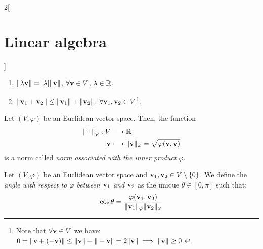 \documentclass[../../../main.tex]{subfiles}
\begin{document}
\begin{multicols}{2}[\section{Linear algebra}]
\begin{definition}
\begin{enumerate}
            \item $\|\lambda \boldsymbol{\mathrm{v}}\|=|\lambda|\|\boldsymbol{\mathrm{v}}\|$, $\forall \boldsymbol{\mathrm{v}}\in V$, $\lambda\in\mathbb{R}$.
            \item $\|\boldsymbol{\mathrm{v}}_1+\boldsymbol{\mathrm{v}}_2\|\leq\|\boldsymbol{\mathrm{v}}_1\|+\|\boldsymbol{\mathrm{v}}_2\|$, $\forall \boldsymbol{\mathrm{v}}_1,\boldsymbol{\mathrm{v}}_2\in V$\footnote{Note that $\forall\boldsymbol{\mathrm{v}}\in V$ we have: $0=\|\boldsymbol{\mathrm{v}}+(-\boldsymbol{\mathrm{v}})\|\leq\|\boldsymbol{\mathrm{v}}\|+\|-\boldsymbol{\mathrm{v}}\|=2\|\boldsymbol{\mathrm{v}}\|\implies\|\boldsymbol{\mathrm{v}}\|\geq 0$.}.
        \end{enumerate}
    \end{definition}
    \begin{prop}
        Let $(V,\varphi)$ be an Euclidean vector space. Then, the function
        \begin{align*}
            \|\cdot\|_\varphi:V & \longrightarrow\mathbb{R}                                                                              \\
            \boldsymbol{\mathrm{v}}  & \longmapsto\|\boldsymbol{\mathrm{v}}\|_\varphi=\sqrt{\varphi(\boldsymbol{\mathrm{v}},\boldsymbol{\mathrm{v}})}
        \end{align*}
        is a norm called \textit{norm associated with the inner product $\varphi$}.
    \end{prop}
    \begin{definition}
        Let $(V,\varphi)$ be an Euclidean vector space and $\boldsymbol{\mathrm{v}}_1,\boldsymbol{\mathrm{v}}_2\in V\setminus\{0\}$. We define the \textit{angle with respect to $\varphi$ between $\boldsymbol{\mathrm{v}}_1$ and $\boldsymbol{\mathrm{v}}_2$} as the unique $\theta\in[0,\pi]$ such that: $$\cos{\theta}=\frac{\varphi(\boldsymbol{\mathrm{v}}_1,\boldsymbol{\mathrm{v}}_2)}{\|\boldsymbol{\mathrm{v}}_1\|_\varphi\|\boldsymbol{\mathrm{v}}_2\|_\varphi}$$
    \end{definition}

\end{multicols}
\end{document}
